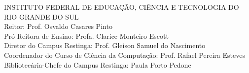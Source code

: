 %
%

\thispagestyle{empty}
\vspace*{\fill}

 \begin{flushleft}
\small \setlength{\baselineskip}{0.8\baselineskip}INSTITUTO FEDERAL DE EDUCAÇÃO, CIÊNCIA E TECNOLOGIA DO RIO GRANDE DO SUL\\
Reitor: Prof. Osvaldo Casares Pinto\\
Pró-Reitora de Ensino: Profa. Clarice Monteiro Escott\\
Diretor do Campus Restinga: Prof. Gleison Samuel do Nascimento\\
Coordenador do Curso de Ciência da Computação: Prof. Rafael Pereira Esteves\\
Bibliotecária-Chefe do Campus Restinga: Paula Porto Pedone\\
\end{flushleft}


